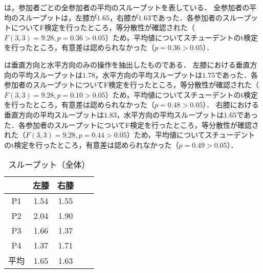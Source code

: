 \documentclass[submit, techrep]{ipsj}
\begin{document}
は，参加者ごとの全参加者の平均のスループットを表している．
全参加者の平均のスループットは，左膝が$1.65$，右膝が$1.63$であった．各参加者のスループットについてF検定を行ったところ，等分散性が確認された（$F(3,3)=9.28, p=0.36>0.05$）ため，平均値についてスチューデントのt検定を行ったところ，有意差は認められなかった（$p=0.36>0.05$）．\par
{}は垂直方向と水平方向のみの操作を抽出したものである．
左膝における垂直方向の平均スループットは$1.78$，水平方向の平均スループットは$1.75$であった．各参加者のスループットについてF検定を行ったところ，等分散性が確認された（$F(3,3)=9.28, p=0.10>0.05$）ため，平均値についてスチューデントのt検定を行ったところ，有意差は認められなかった（$p=0.48>0.05$）．
右膝における垂直方向の平均スループットは$1.83$，水平方向の平均スループットは$1.65$であった．各参加者のスループットについてF検定を行ったところ，等分散性が確認された（$F(3,3)=9.28, p=0.44>0.05$）ため，平均値についてスチューデントのt検定を行ったところ，有意差は認められなかった（$p=0.49>0.05$）．
\begin{table}[tb]
	\begin{center}
		\caption{スループット（全体）}
		\begin{tabular}{|c|c|c|c|c|}
		\hline
 & 左膝 & 右膝 \\ \hline
P1 & 1.54  & 1.55  \\ \hline
P2 & 2.04  & 1.90  \\ \hline
P3 & 1.66  & 1.37  \\ \hline
P4 & 1.37  & 1.71  \\ \hline
平均 & 1.65  & 1.63  \\ \hline
		\end{tabular}
		\label{tb:tp}
	\end{center}
\end{table}
\end{document}
